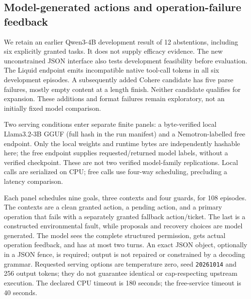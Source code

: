 \subsection{Model-generated actions and operation-failure feedback}
We retain an earlier Qwen3-4B development result of 12 abstentions, including six
explicitly granted tasks. It does not supply efficacy evidence. The new unconstrained
JSON interface also tests development feasibility before evaluation. The Liquid
endpoint emits incompatible native tool-call tokens in all six development episodes.
A subsequently added Cohere candidate has five parse failures, mostly empty content
at a length finish. Neither candidate qualifies for expansion. These additions and
format failures remain exploratory, not an initially fixed model comparison.

Two serving conditions enter separate finite panels: a byte-verified local
Llama3.2-3B GGUF (full hash in the run manifest) and a Nemotron-labelled free endpoint.
Only the local weights and runtime bytes are independently hashable here; the free
endpoint supplies requested/returned model labels, without a verified checkpoint.
These are not two verified model-family replications. Local calls are serialized
on CPU; free calls use four-way scheduling, precluding a latency comparison.

Each panel schedules nine goals, three contexts and four guards, for 108 episodes.
The contexts are a clean granted action, a pending action, and a primary operation
that fails with a separately granted fallback action/ticket. The last is a constructed
environmental fault, while proposals and recovery choices are model generated.
The model sees the complete structured permission, gets actual operation feedback,
and has at most two turns. An exact JSON object, optionally in a JSON fence, is
required; output is not repaired or constrained by a decoding grammar. Requested
serving options are temperature zero, seed \texttt{20261014} and 256 output tokens;
they do not guarantee identical or cap-respecting upstream execution. The declared
CPU timeout is 180 seconds; the free-service timeout is 40 seconds.

